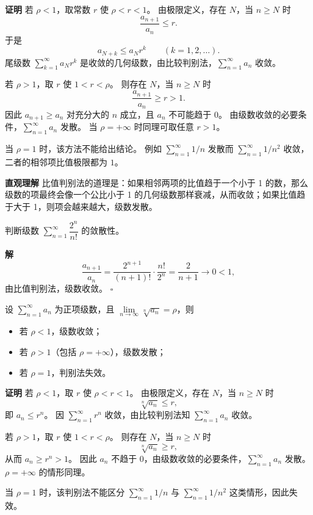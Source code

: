 \documentclass[fontset=fandol]{ctexart}
\newenvironment{custom}[1]{\par\noindent\textbf{#1}\quad}{\par\vspace{0.8em}}
\newenvironment{solution}{\par\noindent\textbf{解}\quad}{\hfill$\square$\par\vspace{0.8em}}
\newenvironment{intuition}{\par\noindent\textbf{直观理解}\quad}{\par\vspace{0.8em}}
\begin{document}
\begin{custom}{证明}
若 $\rho<1$，取常数 $r$ 使 $\rho<r<1$。 由极限定义，存在 $N$，当 $n\ge N$ 时
\[
\frac{a_{n+1}}{a_n}\le r.
\]
于是
\[
a_{N+k}\le a_N r^k\qquad(k=1,2,\ldots).
\]
尾级数 $\sum\limits_{k = 1}^{  \infty }a_N r^k$ 是收敛的几何级数，由比较判别法，$\sum\limits_{n = 1}^{  \infty } a_n$ 收敛。

若 $\rho>1$，取 $r$ 使 $1<r<\rho$。 则存在 $N$，当 $n\ge N$ 时
\[
\frac{a_{n+1}}{a_n}\ge r>1.
\]
因此 $a_{n+1}\ge a_n$ 对充分大的 $n$ 成立，且 $a_n$ 不可能趋于 $0$。 由级数收敛的必要条件，$\sum\limits_{n = 1}^{  \infty } a_n$ 发散。 当 $\rho=+\infty$ 时同理可取任意 $r>1$。

当 $\rho=1$ 时，该方法不能给出结论。 例如 $\sum\limits_{n = 1}^{  \infty } 1/n$ 发散而 $\sum\limits_{n = 1}^{  \infty } 1/n^2$ 收敛，二者的相邻项比值极限都为 $1$。
\end{custom}

\begin{intuition}
比值判别法的道理是：如果相邻两项的比值趋于一个小于 1 的数，那么级数的项最终会像一个公比小于 1 的几何级数那样衰减，从而收敛；如果比值趋于大于 1，则项会越来越大，级数发散。
\end{intuition}

\begin{example}
判断级数 \(\sum\limits_{n = 1}^{  \infty } \dfrac{2^n}{n!}\) 的敛散性。
\end{example}
\begin{solution}
\[
\dfrac{a_{n+1}}{a_n} = \dfrac{2^{n+1}}{(n+1)!} \cdot \dfrac{n!}{2^n} = \dfrac{2}{n+1} \to 0 < 1,
\]
由比值判别法，级数收敛。
\end{solution}

\begin{theorem}
设 \(\sum\limits_{n = 1}^{  \infty } a_n\) 为正项级数，且 \(\lim\limits_{n\to\infty} \sqrt[n]{a_n} = \rho\)，则
\begin{itemize}
\item 若 \(\rho < 1\)，级数收敛；
\item 若 \(\rho > 1\)（包括 \(\rho = +\infty\)），级数发散；
\item 若 \(\rho = 1\)，判别法失效。
\end{itemize}
\end{theorem}

\begin{custom}{证明}
若 $\rho<1$，取 $r$ 使 $\rho<r<1$。 由极限定义，存在 $N$，当 $n\ge N$ 时
\[
\sqrt[n]{a_n}\le r,
\]
即 $a_n\le r^n$。 因 $\sum\limits_{n = 1}^{  \infty } r^n$ 收敛，由比较判别法知 $\sum\limits_{n = 1}^{  \infty } a_n$ 收敛。

若 $\rho>1$，取 $r$ 使 $1<r<\rho$。 则存在 $N$，当 $n\ge N$ 时
\[
\sqrt[n]{a_n}\ge r,
\]
从而 $a_n\ge r^n>1$。 因此 $a_n$ 不趋于 $0$，由级数收敛的必要条件，$\sum\limits_{n = 1}^{  \infty } a_n$ 发散。 $\rho=+\infty$ 的情形同理。

当 $\rho=1$ 时，该判别法不能区分 $\sum\limits_{n = 1}^{  \infty } 1/n$ 与 $\sum\limits_{n = 1}^{  \infty } 1/n^2$ 这类情形，因此失效。
\end{custom}
\end{document}
